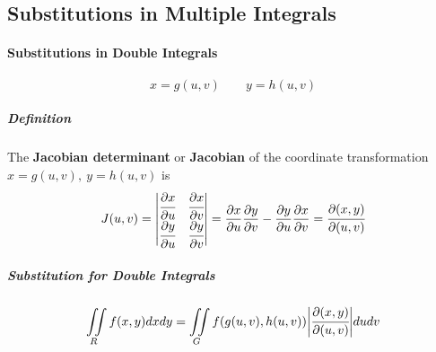 \documentclass{article}
\begin{document}
        \subsection{Substitutions in Multiple Integrals}
            \paragraph{Substitutions in Double Integrals}
                \[x=g(u,v)\qquad y=h(u,v)\]
                \subparagraph{Definition} The \textbf{Jacobian determinant} or \textbf{Jacobian} of the coordinate transformation $x=g(u,v),\ y=h(u,v)$ is
                \[J(u,v)=
                \begin{vmatrix}
                    \cfrac{\partial x}{\partial u}&\cfrac{\partial x}{\partial v}\\
                    \cfrac{\partial y}{\partial u}&\cfrac{\partial y}{\partial v}\\
                \end{vmatrix}=\frac{\partial x}{\partial u}\frac{\partial y}{\partial v}-\frac{\partial y}{\partial u}\frac{\partial x}{\partial v}=\cfrac{\partial(x,y)}{\partial (u,v)}\]
                \subparagraph{Substitution for Double Integrals}
                \[\iint\limits_Rf(x,y)dxdy=\iint\limits_Gf(g(u,v),h(u,v))\bigg|\cfrac{\partial(x,y)}{\partial(u,v)}\bigg|du dv\]
\end{document}
